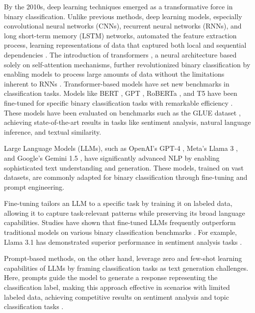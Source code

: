 \documentclass{Configuration_Files/PoliMi3i_thesis}
\begin{document}
By the 2010s, deep learning techniques emerged as a transformative force in binary classification. Unlike previous methods, deep learning models, especially convolutional neural networks (CNNs), recurrent neural networks (RNNs), and long short-term memory (LSTM) networks, automated the feature extraction process, learning representations of data that captured both local and sequential dependencies \cite{goodfellow2016deep}. The introduction of transformers \cite{wolf2020transformers}, a neural architecture based solely on self-attention mechanisms, further revolutionized binary classification by enabling models to process large amounts of data without the limitations inherent to RNNs \cite{vaswani2017attention}. Transformer-based models have set new benchmarks in classification tasks. Models like BERT \cite{devlin-etal-2019-bert}, GPT \cite{yenduri2024gpt}, RoBERTa \cite{Liu2019RoBERTaAR}, and T5 \cite{ni2022sentence} have been fine-tuned for specific binary classification tasks with remarkable efficiency \cite{wolf2020transformers}. These models have been evaluated on benchmarks such as the GLUE dataset \cite{wang2018glue}, achieving state-of-the-art results in tasks like sentiment analysis, natural language inference, and textual similarity.

Large Language Models (LLMs), such as OpenAI’s GPT-4 \cite{aigpt}, Meta’s Llama 3 \cite{dubey2024llama}, and Google’s Gemini 1.5 \cite{team2023gemini}, have significantly advanced NLP by enabling sophisticated text understanding and generation. These models, trained on vast datasets, are commonly adapted for binary classification through fine-tuning and prompt engineering.

Fine-tuning tailors an LLM to a specific task by training it on labeled data, allowing it to capture task-relevant patterns while preserving its broad language capabilities. Studies have shown that fine-tuned LLMs frequently outperform traditional models on various binary classification benchmarks \cite{xiong2024fine}. For example, Llama 3.1 has demonstrated superior performance in sentiment analysis tasks \cite{myscale2024llama}.

Prompt-based methods, on the other hand, leverage zero and few-shot learning capabilities of LLMs by framing classification tasks as text generation challenges. Here, prompts guide the model to generate a response representing the classification label, making this approach effective in scenarios with limited labeled data, achieving competitive results on sentiment analysis and topic classification tasks \cite{liu2023pre}.
\end{document}
